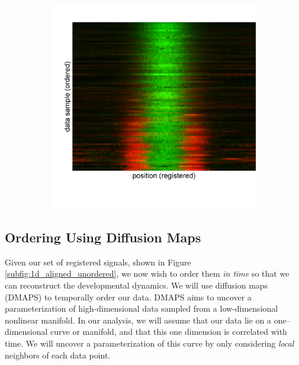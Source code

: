\documentclass[11pt]{article}
\begin{document}
\begin{figure}
\begin{subfigure}{0.2\textwidth}
\caption{}
\label{subfig:1d_aligned_ordered}
\end{subfigure}
\begin{subfigure}{0.2\textwidth}
\includegraphics[width=\textwidth]{registered_ordered_vdm_1d}
\caption{}
\label{subfig:1d_aligned_ordered_vdm}
\end{subfigure}
\caption{}
\label{fig:1d_demo}
\end{figure}

\subsection{Ordering Using Diffusion Maps}

Given our set of registered signals, shown in Figure \ref{subfig:1d_aligned_unordered}, we now wish to order them {\em in time} so that we can reconstruct the developmental dynamics.
%
We will use diffusion maps (DMAPS) \cite{coifman2005geometric} to temporally order our data.
%
DMAPS aims to uncover a parameterization of high-dimensional data sampled from a low-dimensional nonlinear manifold.
%
In our analysis, we will assume that our data lie on a one--dimensional curve or manifold, and that this one dimension is correlated with time. 
%
We will uncover a parameterization of this curve by only considering {\em local} neighbors of each data point.
\end{document}
